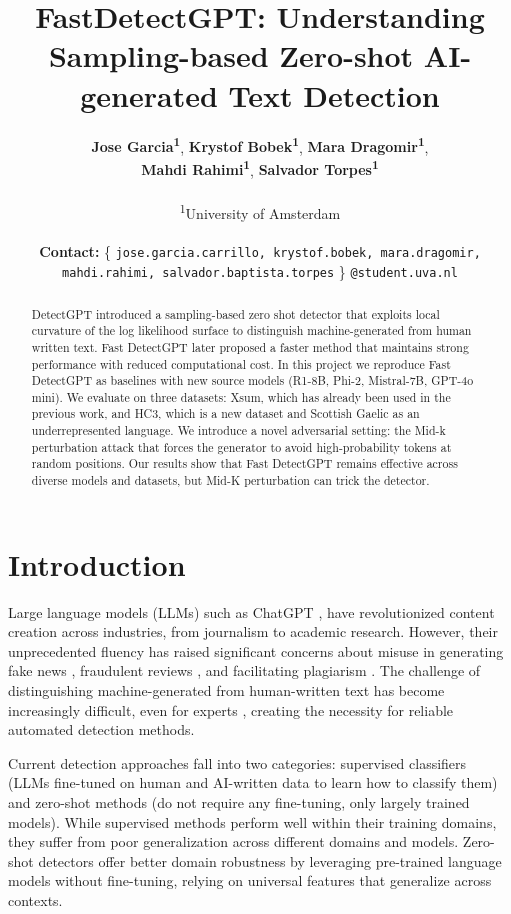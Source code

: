 \documentclass[11pt]{article}
\title{FastDetectGPT: Understanding Sampling-based Zero-shot AI-generated Text Detection}
\author{
  \textbf{Jose Garcia\textsuperscript{1}},
  \textbf{Krystof Bobek\textsuperscript{1}},
  \textbf{Mara Dragomir\textsuperscript{1}}, \\
  \textbf{Mahdi Rahimi\textsuperscript{1}},
  \textbf{Salvador Torpes\textsuperscript{1}}
\\
\\
  \textsuperscript{1}University of Amsterdam
\\
\\
  \textbf{Contact:} \{
    \texttt{jose.garcia.carrillo, krystof.bobek, mara.dragomir,} \\
    \texttt{mahdi.rahimi, salvador.baptista.torpes} \}
    \texttt{@student.uva.nl}
}
\begin{document}
\maketitle

\begin{abstract}
  DetectGPT introduced a sampling-based zero shot detector that exploits local curvature of the log likelihood surface to distinguish machine-generated from human written text. Fast DetectGPT later proposed a faster method that maintains strong performance with reduced computational cost. In this project we reproduce Fast DetectGPT as baselines with new source models (R1-8B, Phi-2, Mistral-7B, GPT-4o mini). We evaluate on three datasets: Xsum, which has already been used in the previous work, and HC3, which is a new dataset and Scottish Gaelic as an underrepresented language. We introduce a novel adversarial setting: the Mid-k perturbation attack that forces the generator to avoid high-probability tokens at random positions. Our results show that Fast DetectGPT remains effective across diverse models and datasets, but Mid-K perturbation can trick the detector.
\end{abstract}

\section{Introduction}

Large language models (LLMs) such as ChatGPT \cite{GPT3}, have revolutionized content creation across industries, from journalism to academic research. However, their unprecedented fluency has raised significant concerns about misuse in generating fake news \cite{ahmed2021detectingfakenewsusing}, fraudulent reviews \cite{adelani2019generatingsentimentpreservingfakeonline}, and facilitating plagiarism \cite{Lee_2023}. The challenge of distinguishing machine-generated from human-written text has become increasingly difficult, even for experts \cite{shahid2022areyouacyborg}, creating the necessity for reliable automated detection methods.

Current detection approaches fall into two categories: supervised classifiers (LLMs fine-tuned on human and AI-written data to learn how to classify them) \cite{mitrovic2023chatgpthumandetectexplain} and zero-shot methods \cite{su2023detectllm} (do not require any fine-tuning, only largely trained models). While supervised methods perform well within their training domains, they suffer from poor generalization across different domains and models. Zero-shot detectors offer better domain robustness by leveraging pre-trained language models without fine-tuning, relying on universal features that generalize across contexts.
\end{document}
